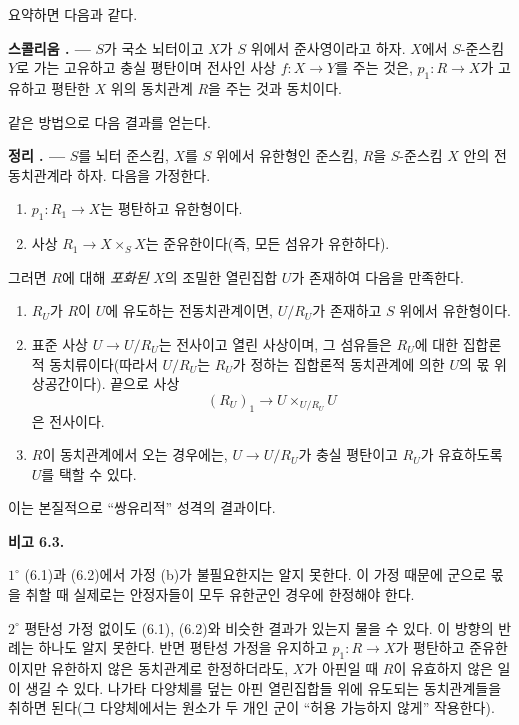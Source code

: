 \documentclass[11pt,twoside,openany]{book}
\numberwithin{equation}{section}
\newcommand{\sourceunit}{front}
\newcommand{\src}[1]{%
  \phantomsection\hypertarget{src:\sourceunit:#1}{}%
  \marginpar{\raggedleft\footnotesize\sffamily #1}%
}
\theoremstyle{plain}
\theoremstyle{definition}
\theoremstyle{remark}
\newcommand{\result}[2]{%
  \par\medskip\noindent\textbf{#1%
  \if\relax\detokenize{#2}\relax\else\space#2\fi. ---}\enspace
}
\begin{document}
요약하면 다음과 같다.

\result{스콜리움}{} $S$가 국소 뇌터이고 $X$가 $S$ 위에서 준사영이라고
하자. $X$에서 $S$-준스킴 $Y$로 가는 고유하고 충실 평탄이며 전사인 사상
$f:X\to Y$를 주는 것은, $p_1:R\to X$가 고유하고 평탄한 $X$ 위의
동치관계 $R$을 주는 것과 동치이다.

같은 방법으로 다음 결과를 얻는다.

\result{정리}{6.2} $S$를 뇌터 준스킴, $X$를 $S$ 위에서 유한형인
준스킴, $R$을 $S$-준스킴 $X$ 안의 전동치관계라 하자. 다음을 가정한다.
\begin{enumerate}
\item[(a)] $p_1:R_1\to X$는 평탄하고 유한형이다.
\item[(b)] 사상 $R_1\to X\times_S X$는 준유한이다(즉, 모든 섬유가
유한하다).
\end{enumerate}
그러면 $R$에 대해 \emph{포화된} $X$의 조밀한 열린집합 $U$가 존재하여
다음을 만족한다.
\begin{enumerate}
\item[(i)] $R_U$가 $R$이 $U$에 유도하는 전동치관계이면, $U/R_U$가
존재하고 $S$ 위에서 유한형이다.

\item[(ii)] 표준 사상 $U\to U/R_U$는 전사이고 열린 사상이며, 그 섬유들은
$R_U$에 대한 집합론적 동치류이다(따라서 $U/R_U$는 $R_U$가 정하는
집합론적 동치관계에 의한 $U$의 몫 위상공간이다). 끝으로 사상
\[
  (R_U)_1\longrightarrow U\times_{U/R_U}U
\]
은 전사이다.
\src{114}

\item[(iii)] $R$이 동치관계에서 오는 경우에는, $U\to U/R_U$가 충실
평탄이고 $R_U$가 유효하도록 $U$를 택할 수 있다.
\end{enumerate}

이는 본질적으로 ``쌍유리적'' 성격의 결과이다.

\medskip
\noindent\textbf{비고 6.3.}

\smallskip
\noindent $1^\circ$ (6.1)과 (6.2)에서 가정 (b)가 불필요한지는 알지
못한다. 이 가정 때문에 군으로 몫을 취할 때 실제로는 안정자들이 모두
유한군인 경우에 한정해야 한다.

\smallskip
\noindent $2^\circ$ 평탄성 가정 없이도 (6.1), (6.2)와 비슷한 결과가
있는지 물을 수 있다. 이 방향의 반례는 하나도 알지 못한다. 반면 평탄성
가정을 유지하고 $p_1:R\to X$가 평탄하고 준유한이지만 유한하지 않은
동치관계로 한정하더라도, $X$가 아핀일 때 $R$이 유효하지 않은 일이 생길
수 있다. 나가타 다양체를 덮는 아핀 열린집합들 위에 유도되는 동치관계들을
취하면 된다(그 다양체에서는 원소가 두 개인 군이 ``허용 가능하지 않게''
작용한다).
\end{document}
